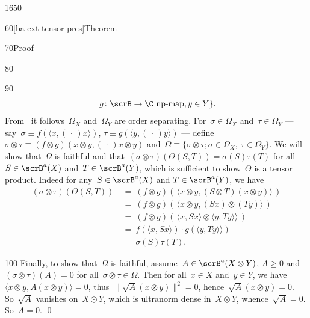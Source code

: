 \begin{parsec}{1650}
\begin{point}{60}[ba-ext-tensor-pres]{Theorem}
\begin{point}{70}{Proof}
\begin{point}{80}
\begin{point}{90}
\begin{align*}
                    \ g \colon \scrB \to \C \text{ np-map}, y\in Y \}.
    \end{align*}
From~
    it follows~$\Omega_X$  and~$\Omega_Y$ are order separating.
For~$\sigma \in \Omega_X$ and~$\tau \in \Omega_Y$
 --- say~$\sigma \equiv f(\langle x, (\,\cdot\,) x\rangle)$,
    $\tau \equiv g(\langle y, (\,\cdot\,) y\rangle)$ ---
    define~$\sigma \otimes \tau \equiv
        (f \otimes g) (x \otimes y, (\,\cdot\,) x\otimes y) $
        and~$\Omega \equiv \{\sigma \otimes \tau; \sigma \in \Omega_X,
                    \ \tau \in \Omega_Y\}$.
We will show
    that~$\Omega$ is faithful
    and that~$(\sigma \otimes \tau)(\Theta(S,T)) = \sigma(S) \tau(T)$
    for all~$S \in \scrB^a(X)$ and~$T \in \scrB^a(Y)$,
    which is sufficient to show~$\Theta$ is a tensor product.
Indeed for any~$S \in \scrB^a(X)$ and $T \in \scrB^a(Y)$, we have
\begin{align*}
    (\sigma \otimes \tau)(\Theta(S, T))
        &\ = \ (f \otimes g) (\, \langle x \otimes y, 
                (S \otimes T) (x \otimes y) \rangle\,)\\
        &\ = \ (f \otimes g) (\,\langle x \otimes y, 
                (S x) \otimes (T y)\rangle\,)\\
        &\ = \ (f \otimes g) (\,
            \langle x, Sx\rangle \otimes
            \langle y, Ty\rangle \rangle\,)\\
        &\ = \ 
            f(\langle x, Sx\rangle ) \cdot
            g(\langle y, Ty\rangle \rangle)\\
        &\ = \ 
            \sigma(S) \tau(T).
\end{align*}
\end{point}
\spacingfix{}
\begin{point}{100}%
Finally, to show that~$\Omega$ is faithful,
        assume~$A \in \scrB^a(X \otimes Y)$, $A \geq 0$
        and $(\sigma \otimes \tau)(A) = 0$
        for all~$\sigma \otimes \tau \in \Omega$.
Then for all~$x \in X$ and~$y \in Y$,
    we have~$\langle x\otimes y, A (x\otimes y)\rangle = 0$,
        thus~$\| \sqrt{A} (x \otimes y) \|^2 = 0$,
        hence~$\sqrt{A} (x \otimes y) = 0$.
So~$\sqrt{A}$ vanishes on~$X \odot Y$,
    which is ultranorm dense in~$X \otimes Y$,
    whence~$\sqrt{A} = 0$. So~$A = 0$.
\qed
\end{point}
\end{point}
\end{point}
\end{point}
\end{parsec}

